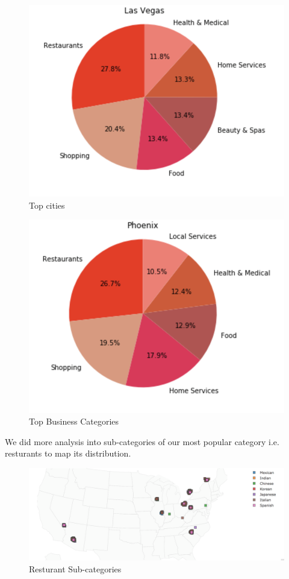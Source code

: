 \documentclass[11pt]{article}
\begin{document}
     	\begin{figure}[h]
     		\centering
     		\includegraphics[scale=0.7] {top_cities.png}
     		\caption{Top cities}
     	\end{figure}
	     \begin{figure}[h]
	     	\centering
	     	\includegraphics[scale=0.7] {top_categroies.png}
	     	\caption{Top Business Categories}
	     \end{figure}
     We did more analysis into sub-categories of our most popular category i.e. resturants to map its distribution.
      \begin{figure}[h]
     	\centering
     	\includegraphics[scale=0.5] {category_map.png}
     	\caption{Resturant Sub-categories}
     \end{figure}
\end{document}
